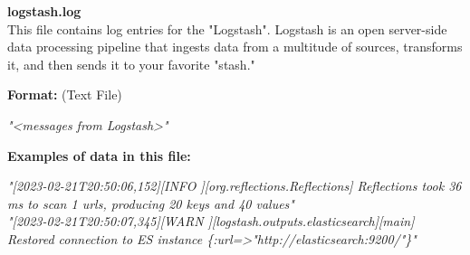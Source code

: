 \begin{description}
\begin{addmargin}[0em]{0em}
    \label{logstash.log}
    \begin{addmargin}[1em]{0em} %
        \textbf{logstash.log}\\
        This file contains log entries for the "Logstash".
        Logstash is an open server-side data processing pipeline that ingests data from a multitude of sources,
        transforms it, and then sends it to your favorite "stash."
        \begin{addmargin}[1em]{0em}
            \textbf{Format:} (Text File)
            \begin{addmargin}[1em]{0em}
                \textit{"<messages from Logstash>"}
            \end{addmargin}
        \end{addmargin}
        \begin{addmargin}[1em]{0em}
            \textbf{Examples of data in this file:}
            \begin{addmargin}[1em]{0em}\textit{"[2023-02-21T20:50:06,152][INFO ][org.reflections.Reflections]
                Reflections took 36 ms to scan 1 urls, producing 20 keys and 40 values"\\
                "[2023-02-21T20:50:07,345][WARN ][logstash.outputs.elasticsearch][main]\\
                Restored connection to ES instance \{:url=>"http://elasticsearch:9200/"\}"}
            \end{addmargin}
        \end{addmargin}
    \end{addmargin} %
    \textbf{\\}


\end{addmargin}
\end{description}
